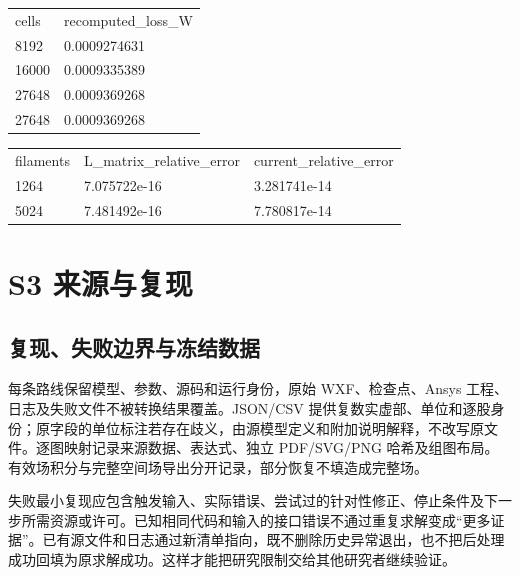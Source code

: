 \documentclass[11pt]{article}
\begin{document}
\begin{table}[!htbp]
\par
\begingroup\footnotesize\begin{tabular}{p{84.9mm}|p{84.9mm}}
\toprule
cells & recomputed\_\allowbreak loss\_\allowbreak W\\
8192 & 0.0009274631\\
16000 & 0.0009335389\\
27648 & 0.0009369268\\
27648 & 0.0009369268\\
\bottomrule\end{tabular}\endgroup
\end{table}
\begin{table}[!htbp]
\par
\begingroup\footnotesize\begin{tabular}{p{55.26666666666667mm}|p{55.26666666666667mm}|p{55.26666666666667mm}}
\toprule
filaments & L\_\allowbreak matrix\_\allowbreak relative\_\allowbreak error & current\_\allowbreak relative\_\allowbreak error\\
1264 & 7.075722e-16 & 3.281741e-14\\
5024 & 7.481492e-16 & 7.780817e-14\\
\bottomrule\end{tabular}\endgroup
\end{table}
\FloatBarrier
\section*{S3 来源与复现}
\hypertarget{chapter-S3}{}
\subsection*{复现、失败边界与冻结数据}
\hypertarget{S3.report_repro.heading}{}
每条路线保留模型、参数、源码和运行身份，原始 WXF、检查点、Ansys 工程、日志及失败文件不被转换结果覆盖。JSON/CSV 提供复数实虚部、单位和逐股身份；原字段的单位标注若存在歧义，由源模型定义和附加说明解释，不改写原文件。逐图映射记录来源数据、表达式、独立 PDF/SVG/PNG 哈希及组图布局。有效场积分与完整空间场导出分开记录，部分恢复不填造成完整场。


失败最小复现应包含触发输入、实际错误、尝试过的针对性修正、停止条件及下一步所需资源或许可。已知相同代码和输入的接口错误不通过重复求解变成“更多证据”。已有源文件和日志通过新清单指向，既不删除历史异常退出，也不把后处理成功回填为原求解成功。这样才能把研究限制交给其他研究者继续验证。
\end{document}
